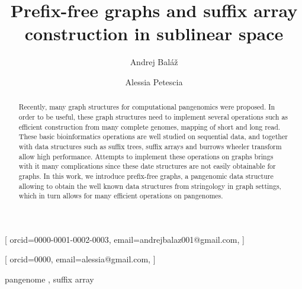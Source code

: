 \documentclass[twocolumn]{ceurart}
\begin{document}


\title{Prefix-free graphs and suffix array construction in sublinear space}

\author[1]{Andrej Baláž}[
    orcid=0000-0001-0002-0003,
    email=andrejbalaz001@gmail.com,
]
\cormark[1]

\author[1]{Alessia Petescia}[
    orcid=0000,
    email=alessia@gmail.com,
]

\address[1]{
    Department of Applied Informatics,
    Faculty of Mathematics, Physics and Informatics,
    Comenius University, Bratislava, Slovakia
}


\begin{abstract}
  Recently, many graph structures for computational pangenomics were proposed.
  In order to be useful, these graph structures need to implement several
  operations such as efficient construction from many complete genomes,
  mapping of short and long read.
  These basic bioinformatics operations are well studied on sequential data,
  and together with data structures such as suffix trees, suffix arrays and 
  burrows wheeler transform allow high performance.
  Attempts to implement these operations on graphs brings with it many complications
  since these date structures are not easily obtainable for graphs.
  In this work, we introduce prefix-free graphs, a pangenomic data structure
  allowing to obtain the well known data structures from stringology in graph
  settings, which in turn allows for many efficient operations on pangenomes.
\end{abstract}

\begin{keywords}
  pangenome \sep
  suffix array
\end{keywords}

\maketitle
\end{document}

